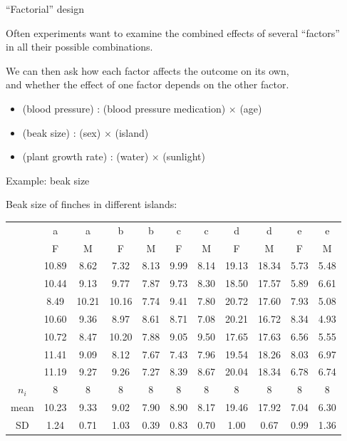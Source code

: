 \begin{frame}{``Factorial'' design}

    Often experiments want to examine the combined effects of several ``factors''\\
    in all their possible combinations. \\

    \vspace{2em}

    We can then ask how each factor affects the outcome on its own,\\
    and whether the effect of one factor depends on the other factor.

    \vspace{2em}


    \begin{itemize}
        \item (blood pressure) :  (blood pressure medication) $\times$ (age)
        \item (beak size) : (sex) $\times$ (island)
        \item (plant growth rate) : (water) $\times$ (sunlight)
    \end{itemize}


\end{frame}

\begin{frame}{Example: beak size}

    Beak size of finches in different islands:

    { \tiny
\begin{tabular}{c|cccccccccc}
    &   a & a & b & b & c & c & d & d & e & e \\
    &   F & M & F & M & F & M & F & M & F & M \\
    \hline
    & 10.89 & 8.62 & 7.32 & 8.13 & 9.99 & 8.14 & 19.13 & 18.34 & 5.73 & 5.48 \\ 
    & 10.44 & 9.13 & 9.77 & 7.87 & 9.73 & 8.30 & 18.50 & 17.57 & 5.89 & 6.61 \\ 
    & 8.49 & 10.21 & 10.16 & 7.74 & 9.41 & 7.80 & 20.72 & 17.60 & 7.93 & 5.08 \\ 
    & 10.60 & 9.36 & 8.97 & 8.61 & 8.71 & 7.08 & 20.21 & 16.72 & 8.34 & 4.93 \\ 
    & 10.72 & 8.47 & 10.20 & 7.88 & 9.05 & 9.50 & 17.65 & 17.63 & 6.56 & 5.55 \\ 
    & 11.41 & 9.09 & 8.12 & 7.67 & 7.43 & 7.96 & 19.54 & 18.26 & 8.03 & 6.97 \\ 
    & 11.19 & 9.27 & 9.26 & 7.27 & 8.39 & 8.67 & 20.04 & 18.34 & 6.78 & 6.74 \\ 
   \hline
$n_i$  &  8     &  8     &  8     &  8      &  8      &  8      &  8     &  8     &  8      &  8      \\
  mean & 10.23 & 9.33 & 9.02 & 7.90 & 8.90 & 8.17 & 19.46 & 17.92 & 7.04 & 6.30 \\ 
  SD   & 1.24 & 0.71 & 1.03 & 0.39 & 0.83 & 0.70 & 1.00 & 0.67 & 0.99 & 1.36 \\ 
\end{tabular}
}
\end{frame}


